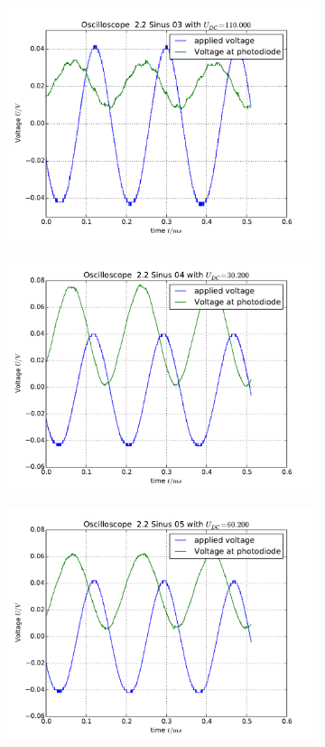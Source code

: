 \begin{figure}
\begin{subfigure}[b]{\picwidth}
        \includegraphics[width=\textwidth]{analysis/figures/22sinus03}
        \caption{}
    \end{subfigure}
    \begin{subfigure}[b]{\picwidth}
        \includegraphics[width=\textwidth]{analysis/figures/22sinus04}
        \caption{}
    \end{subfigure}
    \begin{subfigure}[b]{\picwidth}
        \includegraphics[width=\textwidth]{analysis/figures/22sinus05}

\end{subfigure}
\end{figure}
